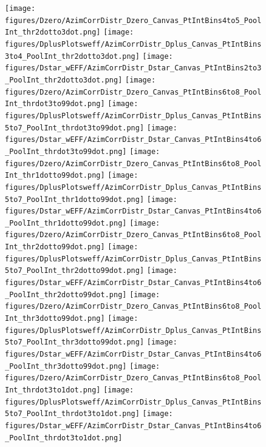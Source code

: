 \begin{figure}[!htbp]
\centering
{\texttt{[image: figures/Dzero/AzimCorrDistr\_Dzero\_Canvas\_PtIntBins4to5\_PoolInt\_thr2dotto3dot.png]}}
{\texttt{[image: figures/DplusPlotsweff/AzimCorrDistr\_Dplus\_Canvas\_PtIntBins3to4\_PoolInt\_thr2dotto3dot.png]}}
{\texttt{[image: figures/Dstar\_wEFF/AzimCorrDistr\_Dstar\_Canvas\_PtIntBins2to3\_PoolInt\_thr2dotto3dot.png]}}
{\texttt{[image: figures/Dzero/AzimCorrDistr\_Dzero\_Canvas\_PtIntBins6to8\_PoolInt\_thrdot3to99dot.png]}}
{\texttt{[image: figures/DplusPlotsweff/AzimCorrDistr\_Dplus\_Canvas\_PtIntBins5to7\_PoolInt\_thrdot3to99dot.png]}}
{\texttt{[image: figures/Dstar\_wEFF/AzimCorrDistr\_Dstar\_Canvas\_PtIntBins4to6\_PoolInt\_thrdot3to99dot.png]}}
{\texttt{[image: figures/Dzero/AzimCorrDistr\_Dzero\_Canvas\_PtIntBins6to8\_PoolInt\_thr1dotto99dot.png]}}
{\texttt{[image: figures/DplusPlotsweff/AzimCorrDistr\_Dplus\_Canvas\_PtIntBins5to7\_PoolInt\_thr1dotto99dot.png]}}
{\texttt{[image: figures/Dstar\_wEFF/AzimCorrDistr\_Dstar\_Canvas\_PtIntBins4to6\_PoolInt\_thr1dotto99dot.png]}}
{\texttt{[image: figures/Dzero/AzimCorrDistr\_Dzero\_Canvas\_PtIntBins6to8\_PoolInt\_thr2dotto99dot.png]}}
{\texttt{[image: figures/DplusPlotsweff/AzimCorrDistr\_Dplus\_Canvas\_PtIntBins5to7\_PoolInt\_thr2dotto99dot.png]}}
{\texttt{[image: figures/Dstar\_wEFF/AzimCorrDistr\_Dstar\_Canvas\_PtIntBins4to6\_PoolInt\_thr2dotto99dot.png]}}
{\texttt{[image: figures/Dzero/AzimCorrDistr\_Dzero\_Canvas\_PtIntBins6to8\_PoolInt\_thr3dotto99dot.png]}}
{\texttt{[image: figures/DplusPlotsweff/AzimCorrDistr\_Dplus\_Canvas\_PtIntBins5to7\_PoolInt\_thr3dotto99dot.png]}}
{\texttt{[image: figures/Dstar\_wEFF/AzimCorrDistr\_Dstar\_Canvas\_PtIntBins4to6\_PoolInt\_thr3dotto99dot.png]}}
{\texttt{[image: figures/Dzero/AzimCorrDistr\_Dzero\_Canvas\_PtIntBins6to8\_PoolInt\_thrdot3to1dot.png]}}
{\texttt{[image: figures/DplusPlotsweff/AzimCorrDistr\_Dplus\_Canvas\_PtIntBins5to7\_PoolInt\_thrdot3to1dot.png]}}
{\texttt{[image: figures/Dstar\_wEFF/AzimCorrDistr\_Dstar\_Canvas\_PtIntBins4to6\_PoolInt\_thrdot3to1dot.png]}}
\end{figure}
